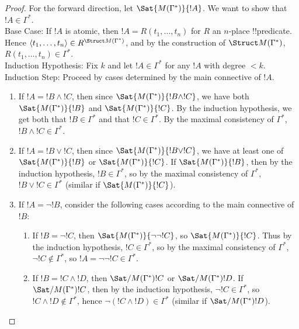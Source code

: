 \documentclass[../../include/open-logic-section]{subfiles}
\begin{document}
\begin{proof}
For the forward direction, let $\Sat{M(\Gamma^*)}{!A}$. We want to show that $!A \in \Gamma^*$. \\

Base Case: If $!A$ is atomic, then $!A = R(t_1, \dots, t_n)$ for $R$ an $n$-place !!{predicate}. Hence 
$\langle t_1, \dots, t_n \rangle \in R^{\Struct M(\Gamma^*)}$, and by the construction of $\Struct 
M(\Gamma^*)$, $R(t_1, \dots, t_n) \in \Gamma^*$.\\

Induction Hypothesis: Fix $k$ and let $!A \in \Gamma^*$ for any $!A$ with degree $<k$. \\

Induction Step: Proceed by cases determined by the main connective of $!A$.

\begin{enumerate}

\item {} If $!A= !B \land !C$, then since $\Sat{M(\Gamma^*)}{!B \land !C}$, we have both 
$\Sat{M(\Gamma^*)}{!B}$ and $\Sat{M(\Gamma^*)}{!C}$. By the induction hypothesis, we get both 
that $!B \in \Gamma^*$ and that $!C \in \Gamma^*$. By the maximal consistency of $\Gamma^*$, 
$!B \land !C \in \Gamma^*$.

\item {} If $!A = !B \lor !C$, then since $\Sat{M(\Gamma^*)}{!B \lor !C}$, we have at least one of 
$\Sat{M(\Gamma^*)}{!B}$ or $\Sat{M(\Gamma^*)}{!C}$. If $\Sat{M(\Gamma^*)}{!B}$, then by the 
induction hypothesis, $!B \in \Gamma^*$, so by the maximal consistency of $\Gamma^*$, $!B \lor !C 
\in \Gamma^*$ (similar if $\Sat{M(\Gamma^*)}{!C}$).

\item {} If $!A=\lnot !B$, consider the following cases according to the main connective of $!B$:
\begin{enumerate}

\item {} If $!B = \lnot !C$, then $\Sat{M(\Gamma^*)}{\lnot\lnot !C}$, so $\Sat{M(\Gamma^*)}{!C}$. 
Thus by the induction hypothesis, $!C \in \Gamma^*$, so by the maximal consistency of 
$\Gamma^*$, $\lnot !C \notin \Gamma^*$, so $!A = \lnot \lnot !C \in \Gamma^*$. 

\item {} If $!B = !C \land !D$, then $\Sat/{M(\Gamma^*)}{!C}$ or $\Sat/{M(\Gamma^*)}{!D}$. If 
$\Sat/{M(\Gamma^*)}{!C}$, then by the induction hypothesis, $\lnot !C \in \Gamma^*$, so $!C \land !D 
\notin \Gamma^*$, hence $\lnot (!C \land !D) \in \Gamma^*$ (similar if $\Sat/{M(\Gamma^*)}{!D}$).


\end{enumerate}
\end{enumerate}
\end{proof}
\end{document}
